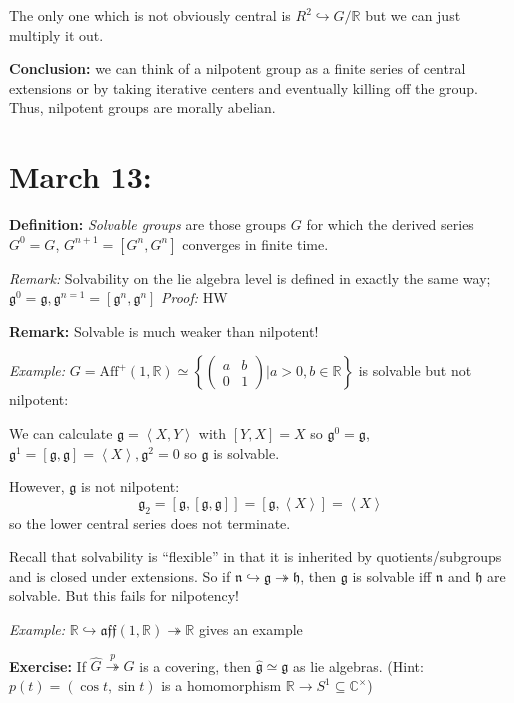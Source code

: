 \documentclass[12pt]{article}
\renewcommand{\hat}[1]{\widehat{#1}}
\newcommand{\R}{\mathbb{R}}
\newcommand{\C}{\mathbb{C}}
\newcommand{\brak}[1]{\left\langle #1 \right\rangle}
\newcommand{\g}{\mathfrak{g}}
\newcommand{\h}{\mathfrak{h}}
\newenvironment*{tbox}[2][gray]{
    \begin{tcolorbox}[
        parbox=false,
        colback=#1!5!white,
        colframe=#1!75!black,
        breakable,
        title={#2}
    ]}
    {\end{tcolorbox}}
\begin{document}
    The only one which is not obviously central is $R^2 \hookrightarrow G/\R$ but we can just multiply it out. 

    \textbf{Conclusion:} we can think of a nilpotent group as a finite series of central extensions or by taking iterative centers and eventually killing off the group. Thus, nilpotent groups are morally abelian. 

\section{March 13:}
    \textbf{Definition:} \emph{Solvable groups} are those groups $G$ for which the derived series $G^0 = G$, $G^{n+1} = [G^n, G^n]$ converges in finite time.

    \begin{tbox}{\textbf{Theorem:} If a group $G$ is connected, $G$ is solvable iff $\g$ is solvable.}
        \emph{Remark:} Solvability on the lie algebra level is defined in exactly the same way; $\g^0 = \g, \g^{n=1} = [\g^n, \g^n]$ 
        \emph{Proof:} HW 
    \end{tbox}
    
    \textbf{Remark:} Solvable is much weaker than nilpotent! 

    \emph{Example:} $G = \text{Aff}^+(1, \R) \simeq \left\{\begin{pmatrix}
        a & b\\ 
        0 & 1
    \end{pmatrix} \bigg\vert a > 0, b \in \R\right\}$ 
    is solvable but not nilpotent: 

    We can calculate $\g = \brak{X, Y}$ with $[Y, X] = X$ so $\g^0 = \g$, $\g^1 = [\g, \g] = \brak{X}, \g^2 = 0$ so $\g$ is solvable. 
    
    However, $\g$ is not nilpotent: 
    \[\g_2 = [\g, [\g, \g]] = [\g, \brak{X}] = \brak{X}\] 
    so the lower central series does not terminate.

    Recall that solvability is ``flexible'' in that it is inherited by quotients/subgroups and is closed under extensions. So if $\mathfrak{n} \hookrightarrow \g \twoheadrightarrow \h$, then $\g$ is solvable iff $\mathfrak{n}$ and $\h$ are solvable. But this fails for nilpotency! 

    \emph{Example:} $\R \hookrightarrow \mathfrak{aff}(1, \R) \twoheadrightarrow \R$ gives an example

    \textbf{Exercise:} If $\hat G \overset{p}{\twoheadrightarrow} G$ is a covering, then $\hat \g \simeq \g$ as lie algebras. (Hint: $p(t) = (\cos t, \sin t)$ is a homomorphism $\R \to S^1 \subseteq \C^{\times}$) 
\end{document}
